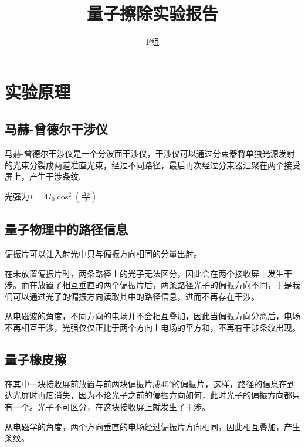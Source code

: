 \documentclass[10pt]{ctexart}
\title{量子擦除实验报告}
\author{F组}
\begin{document}
\maketitle
\section{实验原理}
\subsection{马赫-曾德尔干涉仪}
马赫-曾德尔干涉仪是一个分波面干涉仪，干涉仪可以通过分束器将单独光源发射的光束分裂成两道准直光束，经过不同路径，最后再次经过分束器汇聚在两个接受屏上，产生干涉条纹.

光强为$I=4I_0\cos^2(\frac{\Delta\phi}{2})$
\subsection{量子物理中的路径信息}
偏振片可以让入射光中只与偏振方向相同的分量出射。

在未放置偏振片时，两条路径上的光子无法区分，因此会在两个接收屏上发生干涉。而在放置了相互垂直的两个偏振片后，两条路径光子的偏振方向不同，于是我们可以通过光子的偏振方向读取其中的路径信息，进而不再存在干涉。

从电磁波的角度，不同方向的电场并不会相互叠加，因此当偏振方向分离后，电场不再相互干涉，光强仅仅正比于两个方向上电场的平方和，不再有干涉条纹出现。
\subsection{量子橡皮擦}
在其中一块接收屏前放置与前两块偏振片成45°的偏振片，这样，路径的信息在到达光屏时再度消失，因为不论光子之前的偏振方向如何，此时光子的偏振方向都只有一个。光子不可区分，在这块接收屏上就发生了干涉。

从电磁学的角度，两个方向垂直的电场经过偏振片方向相同，因此相互叠加，产生条纹。
\end{document}
